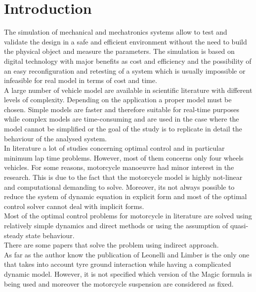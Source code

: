 \chapter*{Introduction}
%
The simulation of mechanical and mechatronics systems allow to test and validate the design in a safe and efficient environment without the need to build the physical object and measure the parameters. The simulation is based on digital technology with major benefits as cost and efficiency and the possibility of an easy reconfiguration and retesting of a system which is usually impossible or infeasible for real model in terms of cost and time.\cite{maria1997introduction}\\
A large number of vehicle model are available in scientific literature with different levels of complexity. Depending on the application a proper model must be chosen. Simple models are faster and therefore suitable for real-time purposes while complex models are time-consuming and are used in the case where the model cannot be simplified or the goal of the study is to replicate in detail the behaviour of the analysed system.\\
%
In literature a lot of studies concerning optimal control and in particular minimum lap time problems. However, most of them concerns only four wheels vehicles. For some reasons, motorcycle manoeuvre had minor interest in the research. This is due to the fact that the motorcycle model is highly not-linear and computational demanding to solve. Moreover, its not always possible to reduce the system of dynamic equation in explicit form and most of the optimal control solver cannot deal with implicit forms.\\
Most of the optimal control problems for motorcycle in literature are solved using relatively simple dynamics and direct methods\cite{sharp2014method,leonelli2019optimal} or using the assumption of quasi-steady state behaviour.\cite{cossalter1999general,simon2008application}\\
There are some papers that solve the problem using indirect approach\cite{bertolazzi2006symbolic}.\\ 
As far as the author know the publication of Leonelli and Limber\cite{leonelli2019optimal} is the only one that takes into account tyre ground interaction while having a complicated dynamic model. However, it is not specified which version of the Magic formula is being used and moreover the motorcycle suspension are considered as fixed.\\   
